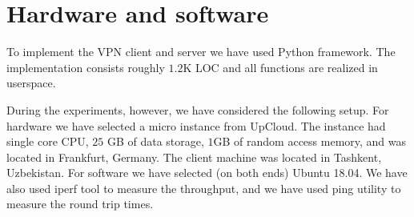 \section{Hardware and software}
\label{sec:hardware}

To implement the VPN client and server we have used Python framework. The implementation
consists roughly $1.2$K LOC and all functions are realized in userspace.

During the experiments, however, we have considered the following setup.
For hardware we have selected a micro instance from UpCloud. The instance had 
single core CPU, $25$ GB of data storage, $1$GB of random access memory, and was 
located in Frankfurt, Germany. The client machine was located in Tashkent, Uzbekistan. 
For software we have selected (on both ends) Ubuntu 18.04. We have also used iperf tool 
to measure the throughput, and we have used ping utility to measure the round trip times. 

